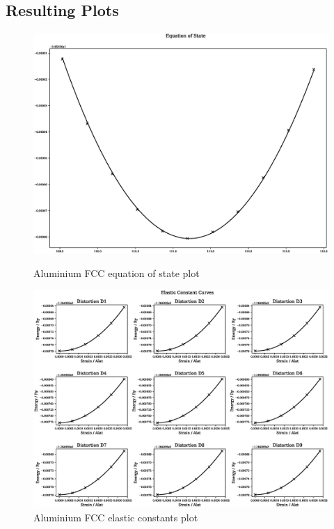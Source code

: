 \FloatBarrier
\subsection{Resulting Plots}

\FloatBarrier
\begin{figure}[!htb]
\includegraphics[width=\linewidth]{appendix/dft_property_calculations/fccal/eos.eps}
\caption{Aluminium FCC equation of state plot}
\label{fig:aleosplot}
\endminipage\hfill
{}
\includegraphics[width=\linewidth]{appendix/dft_property_calculations/fccal/ec.eps}
\caption{Aluminium FCC elastic constants plot}
\label{fig:alecplot}
\endminipage
\end{figure}
\FloatBarrier


